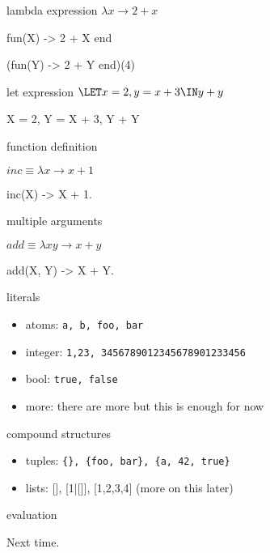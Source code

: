 \begin{frame}{lambda expression}
  $\lambda x \rightarrow 2 + x$
  \pause

  \begin{code}
   fun(X) -> 2 + X end
  \end{code}

  \begin{code}
    (fun(Y) -> 2 + Y end)(4)
  \end{code}
\end{frame}


\begin{frame}{let expression}
  $\LET x = 2, y = x + 3 \IN y + y $
  \pause

  \begin{code}
    X = 2, Y = X + 3, Y + Y
  \end{code}
\end{frame}


\begin{frame}{function definition}

  $inc \equiv \lambda x \rightarrow x + 1$
  \pause

  \begin{code}
    inc(X) -> X + 1.
  \end{code}

\end{frame}

\begin{frame}{multiple arguments}

  $add \equiv \lambda x y \rightarrow x + y$
  \pause

  \begin{code}
    add(X, Y) -> X + Y.
  \end{code}

\end{frame}

\begin{frame}{literals}
 \begin{itemize}
  \pause \item {atoms:} {\tt a, b, foo, bar}
  \pause \item {integer:} {\tt 1,23, 3456789012345678901233456}
  \pause \item {bool:} {\tt true, false}
  \pause \item {more:} there are more but this is enough for now
 \end{itemize}
\end{frame}


\begin{frame}{compound structures}
 \begin{itemize}
  \pause \item {tuples:} {\tt \{\}, \{foo, bar\}, \{a, 42, true\}}
  \pause \item {lists:} [], [1|[]], [1,2,3,4]  (more on this later)
 \end{itemize}
\end{frame}

\begin{frame}{evaluation}

\pause
\vspace{100pt}\hspace{100pt}Next time.

\end{frame}



